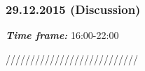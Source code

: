 \subsubsection{29.12.2015 (Discussion)}
\textit{\textbf{Time frame:}} 16:00-22:00 \newline

///////////////////////////
